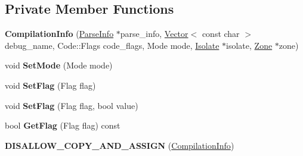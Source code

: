 \subsection*{Private Member Functions}
\begin{DoxyCompactItemize}
\item 
{\bfseries Compilation\+Info} (\hyperlink{classv8_1_1internal_1_1_parse_info}{Parse\+Info} $\ast$parse\+\_\+info, \hyperlink{classv8_1_1internal_1_1_vector}{Vector}$<$ const char $>$ debug\+\_\+name, Code\+::\+Flags code\+\_\+flags, Mode mode, \hyperlink{classv8_1_1internal_1_1_isolate}{Isolate} $\ast$isolate, \hyperlink{classv8_1_1internal_1_1_zone}{Zone} $\ast$zone)\hypertarget{classv8_1_1internal_1_1_compilation_info_aab289586c70b588e658885dfc07b7335}{}\label{classv8_1_1internal_1_1_compilation_info_aab289586c70b588e658885dfc07b7335}

\item 
void {\bfseries Set\+Mode} (Mode mode)\hypertarget{classv8_1_1internal_1_1_compilation_info_a17e5785d40a1b7949a829d628a3157f9}{}\label{classv8_1_1internal_1_1_compilation_info_a17e5785d40a1b7949a829d628a3157f9}

\item 
void {\bfseries Set\+Flag} (Flag flag)\hypertarget{classv8_1_1internal_1_1_compilation_info_a9e5e7c745fab474df6be8751cbef81a7}{}\label{classv8_1_1internal_1_1_compilation_info_a9e5e7c745fab474df6be8751cbef81a7}

\item 
void {\bfseries Set\+Flag} (Flag flag, bool value)\hypertarget{classv8_1_1internal_1_1_compilation_info_a351a64b73f91b4e16727bdea52f74026}{}\label{classv8_1_1internal_1_1_compilation_info_a351a64b73f91b4e16727bdea52f74026}

\item 
bool {\bfseries Get\+Flag} (Flag flag) const \hypertarget{classv8_1_1internal_1_1_compilation_info_a729311d4034ff2ec6e4323443a12be7f}{}\label{classv8_1_1internal_1_1_compilation_info_a729311d4034ff2ec6e4323443a12be7f}

\item 
{\bfseries D\+I\+S\+A\+L\+L\+O\+W\+\_\+\+C\+O\+P\+Y\+\_\+\+A\+N\+D\+\_\+\+A\+S\+S\+I\+GN} (\hyperlink{classv8_1_1internal_1_1_compilation_info}{Compilation\+Info})\hypertarget{classv8_1_1internal_1_1_compilation_info_aee14b387bc2d77858786a013406ff4c2}{}\label{classv8_1_1internal_1_1_compilation_info_aee14b387bc2d77858786a013406ff4c2}

\end{DoxyCompactItemize}
